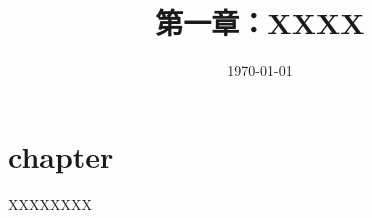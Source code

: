 \documentclass{ctexbook}
\title{第一章：XXXX}
\author{\myAuthor}
\date{\today}
\begin{document}
    \maketitle
\fi

\chapter{chapter}                                     %
XXXXXXXX



\ifx\allfiles\undefined
    
\end{document}
